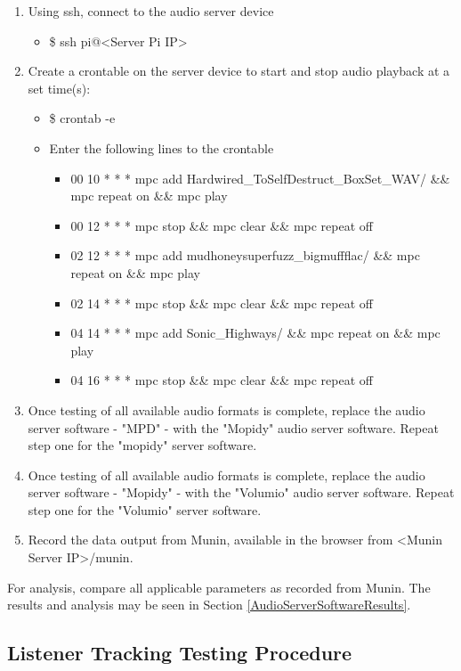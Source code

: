 \documentclass[11pt,a4paper,headinclude=false,footinclude=false]{scrreprt}
\begin{document}
\begin{enumerate}
  \item Using ssh, connect to the audio server device
  \begin{itemize}
    \item \$ ssh pi@<Server Pi IP>
  \end{itemize}
  \item Create a crontable on the server device to start and stop audio playback
  at a set time(s):
  \begin{itemize}
    \item \$ crontab -e
    \item Enter the following lines to the crontable
    \begin{itemize}
     \item 00 10 * * * mpc add Hardwired\_To\textendash{}Self\textendash{}Destruct\_BoxSet\_WAV/ \&\& mpc repeat on \&\& mpc play
     \item 00 12 * * * mpc stop \&\& mpc clear \&\& mpc repeat off
     \item 02 12 * * * mpc add
     mudhoney\textendash{}superfuzz\_bigmuff\textendash{}flac/ \&\& mpc repeat on \&\& mpc play
     \item 02 14 * * * mpc stop \&\& mpc clear \&\& mpc repeat off
     \item 04 14 * * * mpc add Sonic\_Highways/ \&\& mpc repeat on \&\& mpc play
     \item 04 16 * * * mpc stop \&\& mpc clear \&\& mpc repeat off
   \end{itemize}
  \end{itemize}
  \item Once testing of all available audio formats is complete, replace the audio
   server software - "MPD" - with the "Mopidy" audio server software. Repeat step
   one for the "mopidy" server software.
  \item Once testing of all available audio formats is complete, replace the audio
   server software - "Mopidy" - with the "Volumio" audio server software. Repeat
   step one for the "Volumio" server software.
  \item Record the data output from Munin, available in the browser from <Munin
  Server IP>/munin.
\end{enumerate}

For analysis, compare all applicable parameters as recorded from Munin.
The results and analysis may be seen in Section
\ref{AudioServerSoftwareResults}.

\subsection{Listener Tracking Testing
Procedure}\label{listener-tracking-testing-procedure}
\end{document}
